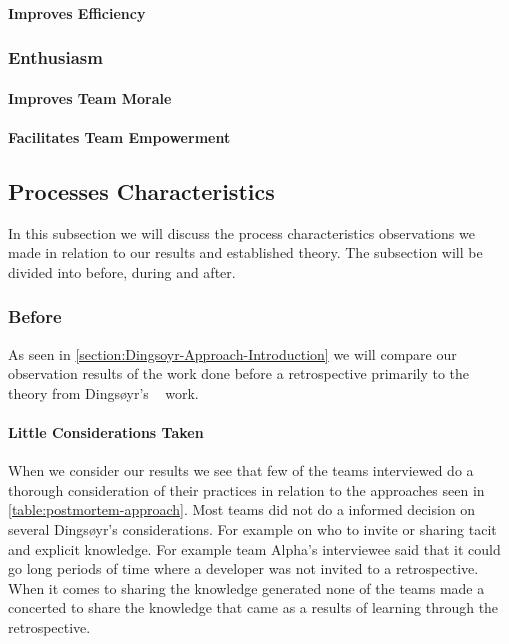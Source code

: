 \paragraph{Improves Efficiency}

\subsubsection{Enthusiasm}
\paragraph{Improves Team Morale}
\paragraph{Facilitates Team Empowerment}

\subsection{Processes Characteristics}
In this subsection we will discuss the process characteristics observations we made in relation to our results and established theory. The subsection will be divided into before, during and after.

\subsubsection{Before}
As seen in \autoref{section:Dingsoyr-Approach-Introduction} we will compare our observation results of the work done before a retrospective primarily to the theory from Dingsøyr's ~\cite{Dingsoyr2004} work. 

\paragraph{Little Considerations Taken}
When we consider our results we see that few of the teams interviewed do a thorough consideration of their practices in relation to the approaches seen in \autoref{table:postmortem-approach}. Most teams did not do a informed decision on several Dingsøyr's considerations. For example on who to invite or sharing tacit and explicit knowledge. For example team Alpha's interviewee said that it could go long periods of time where a developer was not invited to a retrospective. When it comes to sharing the knowledge generated none of the teams made a concerted to share the knowledge that came as a results of learning through the retrospective.

